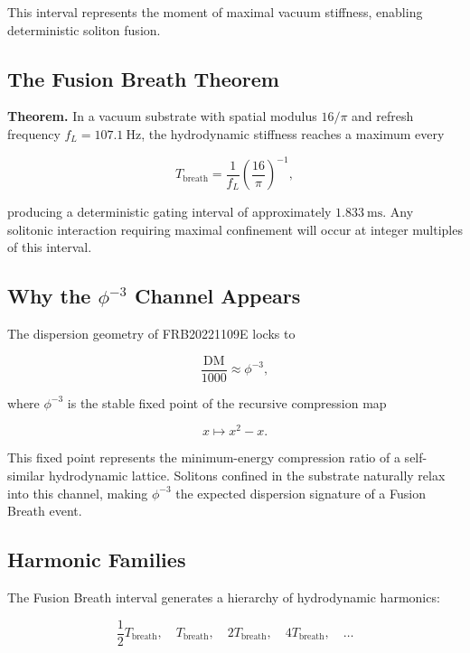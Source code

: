 \documentclass[12pt]{report}
\begin{document}
This interval represents the moment of maximal vacuum stiffness, enabling
deterministic soliton fusion.

\subsection{The Fusion Breath Theorem}

\textbf{Theorem.} In a vacuum substrate with spatial modulus $16/\pi$ and
refresh frequency $f_L = 107.1\ \text{Hz}$, the hydrodynamic stiffness reaches
a maximum every



\[
T_{\text{breath}} = \frac{1}{f_L}\left(\frac{16}{\pi}\right)^{-1},
\]



producing a deterministic gating interval of approximately $1.833\ \text{ms}$.
Any solitonic interaction requiring maximal confinement will occur at integer
multiples of this interval.

\subsection{Why the $\phi^{-3}$ Channel Appears}

The dispersion geometry of FRB20221109E locks to



\[
\frac{\text{DM}}{1000} \approx \phi^{-3},
\]



where $\phi^{-3}$ is the stable fixed point of the recursive compression map



\[
x \mapsto x^2 - x.
\]



This fixed point represents the minimum-energy compression ratio of a
self-similar hydrodynamic lattice. Solitons confined in the substrate naturally
relax into this channel, making $\phi^{-3}$ the expected dispersion signature
of a Fusion Breath event.

\subsection{Harmonic Families}

The Fusion Breath interval generates a hierarchy of hydrodynamic harmonics:



\[
\frac{1}{2}T_{\text{breath}},\quad T_{\text{breath}},\quad
2T_{\text{breath}},\quad 4T_{\text{breath}},\quad \ldots
\]
\end{document}
